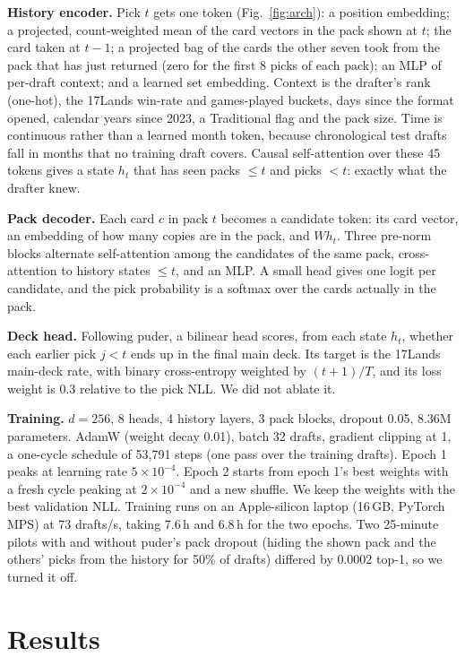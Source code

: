 \documentclass[10pt,letterpaper]{article}
\begin{document}
\textbf{History encoder.} Pick $t$ gets one token (Fig.~\ref{fig:arch}): a position embedding; a projected,
count-weighted mean of the card vectors in the pack shown at $t$; the card taken at $t-1$; a projected
bag of the cards the other seven took from the pack that has just returned (zero for the first 8 picks of
each pack); an MLP of per-draft context; and a learned set embedding. Context is the drafter's rank
(one-hot), the 17Lands win-rate and games-played buckets, days since the format opened, calendar years since 2023,
a Traditional flag and the pack size. Time is continuous rather than a learned month token, because
chronological test drafts fall in months that no training draft covers. Causal self-attention over these 45 tokens
gives a state $h_t$ that has seen packs $\le t$ and picks $< t$: exactly what the drafter knew.

\textbf{Pack decoder.} Each card $c$ in pack $t$ becomes a candidate token: its card vector, an embedding of
how many copies are in the pack, and $W h_t$. Three pre-norm blocks alternate self-attention among the
candidates of the same pack, cross-attention to history states $\le t$, and an MLP. A small head gives one
logit per candidate, and the pick probability is a softmax over the cards actually in the pack.

\textbf{Deck head.} Following puder, a bilinear head scores, from each state $h_t$, whether each earlier
pick $j<t$ ends up in the final main deck. Its target is the 17Lands main-deck rate, with binary cross-entropy weighted by $(t+1)/T$,
and its loss weight is 0.3 relative to the pick NLL. We did not ablate it.

\textbf{Training.} $d=256$, 8 heads, 4 history layers, 3 pack blocks, dropout 0.05, 8.36M parameters.
AdamW (weight decay 0.01), batch 32 drafts, gradient clipping at 1, a one-cycle schedule of 53,791 steps
(one pass over the training drafts). Epoch 1 peaks at learning rate $5\!\times\!10^{-4}$. Epoch 2 starts from epoch 1's
best weights with a fresh cycle peaking at $2\!\times\!10^{-4}$ and a new shuffle. We keep the weights with the best
validation NLL. Training runs on an Apple-silicon laptop (16\,GB, PyTorch MPS) at 73 drafts/s, taking 7.6\,h and
6.8\,h for the two epochs. Two 25-minute pilots with and without puder's pack dropout (hiding the
shown pack and the others' picks from the history for 50\% of drafts) differed by 0.0002 top-1, so we turned
it off.

\section{Results}\label{sec:results}
\end{document}
